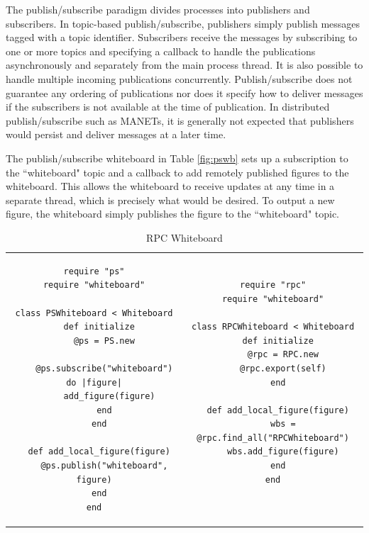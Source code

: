 \documentclass{llncs}
\begin{document}
The publish/subscribe paradigm divides processes into publishers and subscribers. In topic-based publish/subscribe, publishers simply publish messages tagged with a topic identifier. Subscribers receive the messages by subscribing to one or more topics and specifying a callback to handle the publications asynchronously and separately from the main process thread. It is also possible to handle multiple incoming publications concurrently. Publish/subscribe does not guarantee any ordering of publications nor does it specify how to deliver messages if the subscribers is not available at the time of publication. In distributed publish/subscribe such as MANETs, it is generally not expected that publishers would persist and deliver messages at a later time\cite{psfaces}.

The publish/subscribe whiteboard in Table \ref{fig:pswb} sets up a subscription to the ``whiteboard" topic and a callback to add remotely published figures to the whiteboard. This allows the whiteboard to receive updates at any time in a separate thread, which is precisely what would be desired. To output a new figure, the whiteboard simply publishes the figure to the ``whiteboard" topic.

\begin{table}
\centering
\begin{tabular}{c c}
\begin{minipage}{2.75in}
\begin{verbatim}
require "ps"
require "whiteboard"

class PSWhiteboard < Whiteboard
  def initialize
    @ps = PS.new
    
    @ps.subscribe("whiteboard") do |figure|
      add_figure(figure)
    end
  end

  def add_local_figure(figure)
    @ps.publish("whiteboard", figure)
  end
end
\end{verbatim}
\caption{Publish/Subscribe Whiteboard}\label{fig:pswb}
\end{minipage}
&
\begin{minipage}{2.5in}
\begin{verbatim}
require "rpc"
require "whiteboard"

class RPCWhiteboard < Whiteboard
  def initialize
    @rpc = RPC.new
    @rpc.export(self)
  end

  def add_local_figure(figure)
    wbs = @rpc.find_all("RPCWhiteboard")
    wbs.add_figure(figure)
  end
end


\end{verbatim}
\caption{RPC Whiteboard}\label{fig:rpcwb}
\end{minipage}
\end{tabular}
\end{table}
\end{document}
